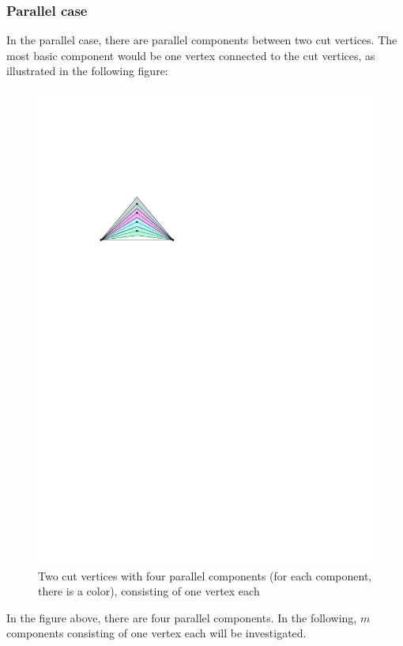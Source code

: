 \subsubsection{Parallel case}
In the parallel case, there are parallel components between two cut vertices. The most basic component would be one vertex connected to the cut vertices, as illustrated in the following figure:
\begin{figure}[H]
	\centering
	\includegraphics[width=.7\linewidth,page=1]{drawings/2-trees.pdf}
	\caption{Two cut vertices with four parallel components (for each component, there is a color), consisting of one vertex each}
\end{figure}
In the figure above, there are four parallel components. In the following, $m$ components consisting of one vertex each will be investigated.
